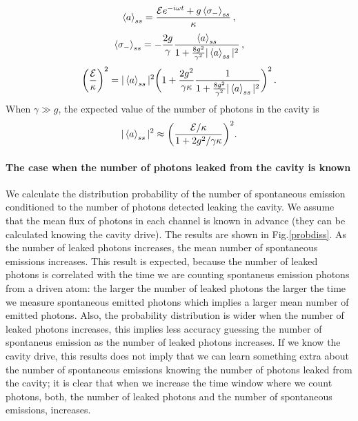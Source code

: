 \documentclass[%
 reprint,
 amsmath,amssymb,
 aps, 
]{revtex4-1}
\begin{document}
\begin{equation} \label{chaf1}
\expval{a}_{ss} = \frac{\mathcal{E}e^{-i\omega t} +
  g\expval{\sigma_-}_{ss}}{\kappa}\, ,
\end{equation}
\begin{equation} \label{chaf2}
\expval{\sigma_-}_{ss} = -\frac{2g}{\gamma}\frac{\expval{a}_{ss}}{1 +
  \frac{8g^2}{\gamma^2}|\expval{a}_{ss}|^2}\, ,
\end{equation}
\begin{equation}
\bigg(\frac{\mathcal{E}}{\kappa}\bigg)^2 = |\expval{a}_{ss}|^2 \bigg(1
+ \frac{2g^2}{\gamma \kappa}\frac{1}{1 +
  \frac{8g^2}{\gamma^2}|\expval{a}_{ss}|^2}\bigg)^2\, .
\end{equation}
When $\gamma \gg g$, the expected value of the number of photons in
the cavity is 
\begin{equation} \label{numfo}
|\expval{a}_{ss}|^2 \approx \bigg(\frac{\mathcal{E}/\kappa}{1 + 2g^2/\gamma \kappa}\bigg)^2.
\end{equation}

\paragraph{The case when the number of photons leaked from the cavity  is known}
We calculate the distribution probability of the number of spontaneous
emission conditioned to the number of photons detected leaking the
cavity. We assume that the mean flux of photons in each channel is
known in advance (they can be calculated knowing the cavity drive).
The results are shown in Fig.\ref{probdiss}. As the number of leaked
photons increases, the mean number of spontaneous emissions increases.
This result is expected, because the number of leaked photons is
correlated with the time we are counting spontaneus emission photons
from a driven atom: the larger the number of leaked photons the larger
the time we measure spontaneous emitted photons which implies a larger
mean number of emitted photons. Also, the probability distribution is
wider when the number of leaked photons increases, this implies less
accuracy guessing the number of spontaneus emission as the number of
leaked photons increases. If we know the cavity drive, this results
does not imply that we can learn something extra about the number of
spontaneous emissions knowing the number of photons leaked from the
cavity; it is clear that when we increase the time window where we
count photons, both, the number of leaked photons and the number of
spontaneous emissions, increases.
\end{document}
